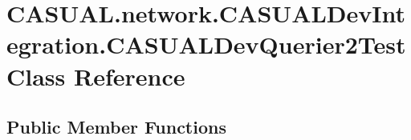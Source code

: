 \hypertarget{class_c_a_s_u_a_l_1_1network_1_1_c_a_s_u_a_l_dev_integration_1_1_c_a_s_u_a_l_dev_querier2_test}{\section{C\-A\-S\-U\-A\-L.\-network.\-C\-A\-S\-U\-A\-L\-Dev\-Integration.\-C\-A\-S\-U\-A\-L\-Dev\-Querier2\-Test Class Reference}
\label{class_c_a_s_u_a_l_1_1network_1_1_c_a_s_u_a_l_dev_integration_1_1_c_a_s_u_a_l_dev_querier2_test}
}
\subsection*{Public Member Functions}
